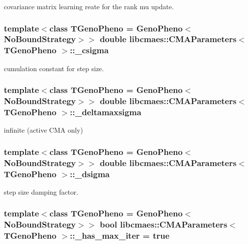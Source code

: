 covariance matrix learning reate for the rank mu update. \hypertarget{classlibcmaes_1_1CMAParameters_a9fc0879daeaeeb882192feddb0efecfc}{
\subsubsection[{\-\_\-csigma}]{\setlength{\rightskip}{0pt plus 5cm}template$<$class T\-Geno\-Pheno = Geno\-Pheno$<$\-No\-Bound\-Strategy$>$$>$ double {\bf libcmaes\-::\-C\-M\-A\-Parameters}$<$ T\-Geno\-Pheno $>$\-::\-\_\-csigma}}\label{classlibcmaes_1_1CMAParameters_a9fc0879daeaeeb882192feddb0efecfc}
cumulation constant for step size. \hypertarget{classlibcmaes_1_1CMAParameters_a011a9f790bc21c6bea155066a26f5181}{
\subsubsection[{\-\_\-deltamaxsigma}]{\setlength{\rightskip}{0pt plus 5cm}template$<$class T\-Geno\-Pheno = Geno\-Pheno$<$\-No\-Bound\-Strategy$>$$>$ double {\bf libcmaes\-::\-C\-M\-A\-Parameters}$<$ T\-Geno\-Pheno $>$\-::\-\_\-deltamaxsigma}}\label{classlibcmaes_1_1CMAParameters_a011a9f790bc21c6bea155066a26f5181}
infinite (active C\-M\-A only) \hypertarget{classlibcmaes_1_1CMAParameters_a87f2b165fab84e65672361e5d6ac7f3d}{
\subsubsection[{\-\_\-dsigma}]{\setlength{\rightskip}{0pt plus 5cm}template$<$class T\-Geno\-Pheno = Geno\-Pheno$<$\-No\-Bound\-Strategy$>$$>$ double {\bf libcmaes\-::\-C\-M\-A\-Parameters}$<$ T\-Geno\-Pheno $>$\-::\-\_\-dsigma}}\label{classlibcmaes_1_1CMAParameters_a87f2b165fab84e65672361e5d6ac7f3d}
step size damping factor. \hypertarget{classlibcmaes_1_1CMAParameters_a9a66e6d8cf1e1c67cd9c43d5c87a71d1}{
\subsubsection[{\-\_\-has\-\_\-max\-\_\-iter}]{\setlength{\rightskip}{0pt plus 5cm}template$<$class T\-Geno\-Pheno = Geno\-Pheno$<$\-No\-Bound\-Strategy$>$$>$ bool {\bf libcmaes\-::\-C\-M\-A\-Parameters}$<$ T\-Geno\-Pheno $>$\-::\-\_\-has\-\_\-max\-\_\-iter = true}}\label{classlibcmaes_1_1CMAParameters_a9a66e6d8cf1e1c67cd9c43d5c87a71d1}
